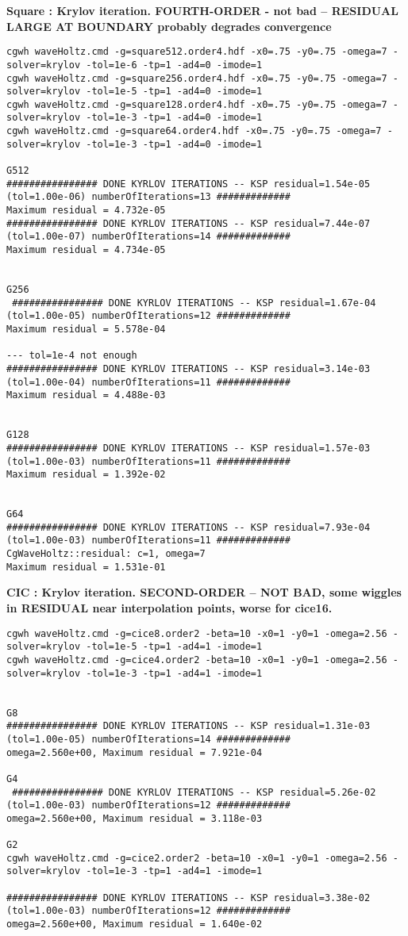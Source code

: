 \documentclass[preprint,11pt]{elsarticle}
\begin{document}
\bigskip
\textbf{Square  : Krylov iteration. FOURTH-ORDER  - not bad -- RESIDUAL LARGE AT BOUNDARY probably degrades convergence}
\begin{Verbatim}[fontsize=\scriptsize]
cgwh waveHoltz.cmd -g=square512.order4.hdf -x0=.75 -y0=.75 -omega=7 -solver=krylov -tol=1e-6 -tp=1 -ad4=0 -imode=1
cgwh waveHoltz.cmd -g=square256.order4.hdf -x0=.75 -y0=.75 -omega=7 -solver=krylov -tol=1e-5 -tp=1 -ad4=0 -imode=1
cgwh waveHoltz.cmd -g=square128.order4.hdf -x0=.75 -y0=.75 -omega=7 -solver=krylov -tol=1e-3 -tp=1 -ad4=0 -imode=1
cgwh waveHoltz.cmd -g=square64.order4.hdf -x0=.75 -y0=.75 -omega=7 -solver=krylov -tol=1e-3 -tp=1 -ad4=0 -imode=1

G512
################ DONE KYRLOV ITERATIONS -- KSP residual=1.54e-05 (tol=1.00e-06) numberOfIterations=13 #############
Maximum residual = 4.732e-05
################ DONE KYRLOV ITERATIONS -- KSP residual=7.44e-07 (tol=1.00e-07) numberOfIterations=14 #############
Maximum residual = 4.734e-05


G256
 ################ DONE KYRLOV ITERATIONS -- KSP residual=1.67e-04 (tol=1.00e-05) numberOfIterations=12 #############
Maximum residual = 5.578e-04

--- tol=1e-4 not enough
################ DONE KYRLOV ITERATIONS -- KSP residual=3.14e-03 (tol=1.00e-04) numberOfIterations=11 #############
Maximum residual = 4.488e-03


G128 
################ DONE KYRLOV ITERATIONS -- KSP residual=1.57e-03 (tol=1.00e-03) numberOfIterations=11 #############
Maximum residual = 1.392e-02


G64 
################ DONE KYRLOV ITERATIONS -- KSP residual=7.93e-04 (tol=1.00e-03) numberOfIterations=11 #############
CgWaveHoltz::residual: c=1, omega=7
Maximum residual = 1.531e-01

\end{Verbatim}

\bigskip
\bigskip
\bigskip
\textbf{CIC  : Krylov iteration. SECOND-ORDER -- NOT BAD, some wiggles in RESIDUAL near interpolation points, worse for cice16.}
\begin{Verbatim}[fontsize=\scriptsize]
cgwh waveHoltz.cmd -g=cice8.order2 -beta=10 -x0=1 -y0=1 -omega=2.56 -solver=krylov -tol=1e-5 -tp=1 -ad4=1 -imode=1
cgwh waveHoltz.cmd -g=cice4.order2 -beta=10 -x0=1 -y0=1 -omega=2.56 -solver=krylov -tol=1e-3 -tp=1 -ad4=1 -imode=1


G8
################ DONE KYRLOV ITERATIONS -- KSP residual=1.31e-03 (tol=1.00e-05) numberOfIterations=14 #############
omega=2.560e+00, Maximum residual = 7.921e-04

G4
 ################ DONE KYRLOV ITERATIONS -- KSP residual=5.26e-02 (tol=1.00e-03) numberOfIterations=12 #############
omega=2.560e+00, Maximum residual = 3.118e-03

G2 
cgwh waveHoltz.cmd -g=cice2.order2 -beta=10 -x0=1 -y0=1 -omega=2.56 -solver=krylov -tol=1e-3 -tp=1 -ad4=1 -imode=1

################ DONE KYRLOV ITERATIONS -- KSP residual=3.38e-02 (tol=1.00e-03) numberOfIterations=12 #############
omega=2.560e+00, Maximum residual = 1.640e-02

\end{Verbatim}




\end{document}
